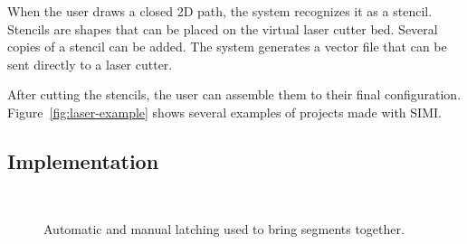 \documentclass{article}
\begin{document}
When the user draws a closed 2D path, the system recognizes it as a
stencil. Stencils are shapes that can be placed on the virtual laser
cutter bed. Several copies of a stencil can be added. The system
generates a vector file that can be sent directly to a laser cutter.

After cutting the stencils, the user can assemble them to their final
configuration. Figure~\ref{fig:laser-example} shows several examples
of projects made with SIMI.

\subsection{Implementation}

\begin{figure}[h]
\centering {}\hspace{5mm}
\\
\hspace{5mm}
\caption{Automatic and manual latching used to bring segments together.}
\label{fig:latch}
\end{figure}
\end{document}
